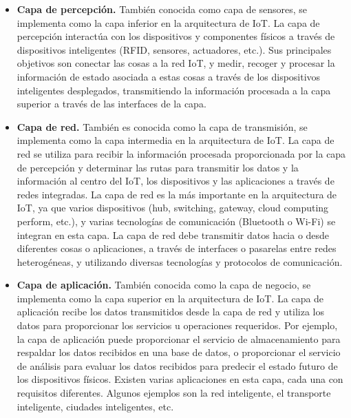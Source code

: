 {\begin{itemize}
    \item \textbf{Capa de percepción.} También conocida como capa de sensores, se implementa como la capa inferior en la arquitectura de IoT. La capa de percepción interactúa con los dispositivos y componentes físicos a través de dispositivos inteligentes (RFID, sensores, actuadores, etc.). Sus principales objetivos son conectar las cosas a la red IoT, y medir, recoger y procesar la información de estado asociada a estas cosas a través de los dispositivos inteligentes desplegados, transmitiendo la información procesada a la capa superior a través de las interfaces de la capa.
    \item \textbf{Capa de red.} También es conocida como la capa de transmisión, se implementa como la capa intermedia en la arquitectura de IoT. La capa de red se utiliza para recibir la información procesada proporcionada por la capa de percepción y determinar las rutas para transmitir los datos y la información al centro del IoT, los dispositivos y las aplicaciones a través de redes integradas. La capa de red es la más importante en la arquitectura de IoT, ya que varios dispositivos (hub, switching, gateway, cloud computing perform, etc.), y varias tecnologías de comunicación (Bluetooth o Wi-Fi) se integran en esta capa. La capa de red debe transmitir datos hacia o desde diferentes cosas o aplicaciones, a través de interfaces o pasarelas entre redes heterogéneas, y utilizando diversas tecnologías y protocolos de comunicación.
    \item \textbf{Capa de aplicación.} También conocida como la capa de negocio, se implementa como la capa superior en la arquitectura de IoT. La capa de aplicación recibe los datos transmitidos desde la capa de red y utiliza los datos para proporcionar los servicios u operaciones requeridos. Por ejemplo, la capa de aplicación puede proporcionar el servicio de almacenamiento para respaldar los datos recibidos en una base de datos, o proporcionar el servicio de análisis para evaluar los datos recibidos para predecir el estado futuro de los dispositivos físicos. Existen varias aplicaciones en esta capa, cada una con requisitos diferentes. Algunos ejemplos son la red inteligente, el transporte inteligente, ciudades inteligentes, etc.

\end{itemize}

}
